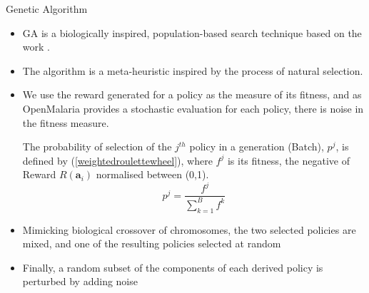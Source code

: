 \documentclass{beamer}
\begin{document}
\begin{frame}{Genetic Algorithm}

\begin{itemize}
\item  GA is a biologically inspired, population-based search technique based on the work \cite{Holland1992}.
\item The algorithm is a meta-heuristic inspired by the process of natural selection.
\item We use the reward generated for a policy as the measure of its fitness, and as OpenMalaria provides a stochastic evaluation for each policy, there is noise in the fitness measure.




The probability of selection of the $j^{th}$ policy in a generation (Batch), $p^j$, is defined by (\ref{weightedroulettewheel}), where $f^j$ is its fitness, the negative of Reward $R(\bm{a}_i)$ normalised between (0,1).
\begin{equation}
p^j = \frac{f^j}{\sum_{k=1}^{B} f^k}
\label{weightedroulettewheel}
\end{equation}


\item Mimicking biological crossover of chromosomes, the two selected policies are mixed, and one of the resulting policies selected at random
\item Finally, a random subset of the components of each derived policy is perturbed by adding noise
\end{itemize}

\end{frame}
\end{document}
